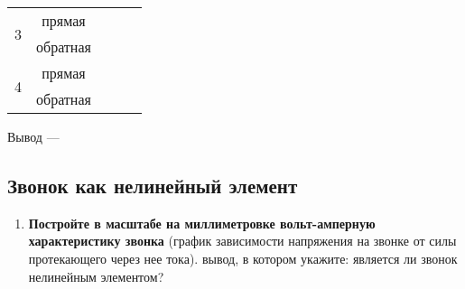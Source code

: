 \begin{table}[h]
\begin{tabular}{|c|c|c|c|c|}
\multirow{2}{*}{3}                                                        & прямая     &                                                                     &                                                                      &                                                                       \\ \cline{2-5} 
                                                                          & обратная   &                                                                     &                                                                      &                                                                       \\ \hline
\multirow{2}{*}{4}                                                        & прямая     &                                                                     &                                                                      &                                                                       \\ \cline{2-5} 
                                                                          & обратная   &                                                                     &                                                                      &                                                                       \\ \hline
\end{tabular}
\end{table}

Вывод --- \hrulefill

\hrulefill

\hrulefill


\subsection{Звонок как нелинейный элемент}

\begin{enumerate}
     схему, представленную на рисунке \ref{fig:5.4}. Укажите направление силы тока в ней при замкнутом ключе К.
     движок реостата из крайнего верхнего положения в крайнее нижнее, измерьте напряжение на звонке и силу тока в нем для пяти различных положений движка реостата для прямой и обратной полярности (при этом значения напряжения и силы тока быть отрицательными) включения звонка (включая крайнее верхнее и крайнее нижнее). Результаты измерений занесите в таблицу \ref{tab:5.4}. 
     измеренные значения, рассчитайте сопротивление звонка в каждом случае и занесите его значение в таблицу \ref{tab:5.4}.
     полученные сопротивления звонка в различных опытах. Как изменяется сопротивление звонка в зависимости от напряжения на нем и его полярности?
    \item \textbf{Постройте в масштабе на миллиметровке вольт-амперную характеристику звонка} (график зависимости напряжения на звонке от силы протекающего через нее тока).
     вывод, в котором укажите: является ли звонок нелинейным элементом? 
\end{enumerate}

